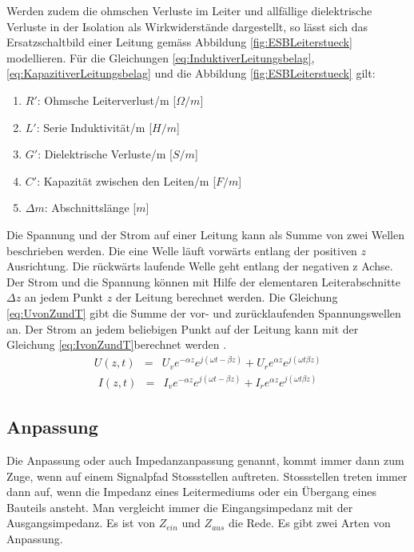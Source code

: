 Werden zudem die ohmschen Verluste im Leiter und allfällige dielektrische Verluste in der Isolation als Wirkwiderstände dargestellt, so lässt sich das Ersatzschaltbild einer Leitung gemäss Abbildung \ref{fig:ESBLeiterstueck} modellieren.
Für die Gleichungen \ref{eq:InduktiverLeitungsbelag}, \ref{eq:KapazitiverLeitungsbelag} und die Abbildung \ref{fig:ESBLeiterstueck} gilt:
\begin{enumerate}[leftmargin=2cm]
   \item[] $R'$: Ohmsche Leiterverlust/m [$\Omega/m$] 
   \item[] $L'$: Serie Induktivität/m  [$H/m$] 
   \item[] $G'$: Dielektrische Verluste/m  [$S/m$] 
   \item[] $C'$: Kapazität zwischen den Leiten/m  [$F/m$] 
   \item[] $\Delta m$: Abschnittslänge  [$m$] 
\end{enumerate} 
Die Spannung und der Strom auf einer Leitung kann als Summe von zwei Wellen beschrieben werden. Die eine Welle läuft vorwärts entlang der positiven $z$ Ausrichtung. Die rückwärts laufende Welle geht entlang der negativen z Achse. Der Strom und die Spannung können mit Hilfe der elementaren Leiterabschnitte $\Delta z$ an jedem Punkt $z$  der Leitung berechnet werden. Die Gleichung \ref{eq:UvonZundT} gibt die Summe der vor- und zurücklaufenden Spannungswellen an. Der Strom an jedem beliebigen Punkt auf der Leitung kann mit der Gleichung \ref{eq:IvonZundT}berechnet werden \cite{Tekom}.
\begin{eqnarray}\label{eq:UvonZundT}
U(z,t) &=& U_{v}e^{-\alpha z}e^{j(\omega t -\beta z)}+U_{r}e^{\alpha z}e^{j(\omega t \beta z)}
\end{eqnarray}
\begin{eqnarray}\label{eq:IvonZundT}
I(z,t) &=& I_{v}e^{-\alpha z}e^{j(\omega t -\beta z)}+I_{r}e^{\alpha z}e^{j(\omega t \beta z)}
\end{eqnarray}


\subsection{Anpassung}
Die Anpassung oder auch Impedanzanpassung genannt, kommt immer dann zum Zuge, wenn auf einem Signalpfad Stossstellen auftreten. Stossstellen treten immer dann auf, wenn die Impedanz eines Leitermediums oder ein Übergang eines Bauteils ansteht. 
Man vergleicht immer die Eingangsimpedanz mit der Ausgangsimpedanz. Es ist  von $Z_{ein}$ und $Z_{aus}$ die Rede.
Es gibt zwei Arten von Anpassung.
